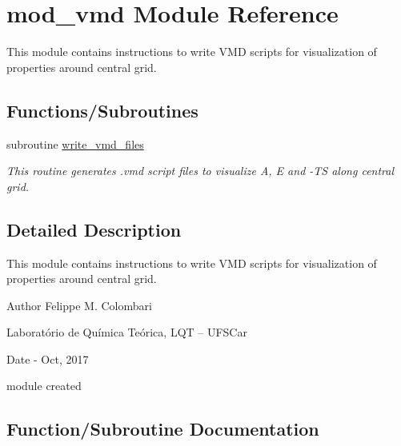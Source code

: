 \hypertarget{namespacemod__vmd}{}\section{mod\+\_\+vmd Module Reference}
\label{namespacemod__vmd}


This module contains instructions to write V\+MD scripts for visualization of properties around central grid.  


\subsection*{Functions/\+Subroutines}
\begin{DoxyCompactItemize}
\item 
subroutine \hyperlink{namespacemod__vmd_a22ecc122e04e73317480e5b7d6ba38ce}{write\+\_\+vmd\+\_\+files}
\begin{DoxyCompactList}\small\item\em This routine generates .vmd script files to visualize A, E and -\/\+TS along central grid. \end{DoxyCompactList}\end{DoxyCompactItemize}


\subsection{Detailed Description}
This module contains instructions to write V\+MD scripts for visualization of properties around central grid. 

\begin{DoxyAuthor}{Author}
Felippe M. Colombari
\begin{DoxyItemize}
\item Laboratório de Química Teórica, L\+QT -- U\+F\+S\+Car 
\end{DoxyItemize}
\end{DoxyAuthor}
\begin{DoxyDate}{Date}
-\/ Oct, 2017
\begin{DoxyItemize}
\item module created 
\end{DoxyItemize}
\end{DoxyDate}


\subsection{Function/\+Subroutine Documentation}

